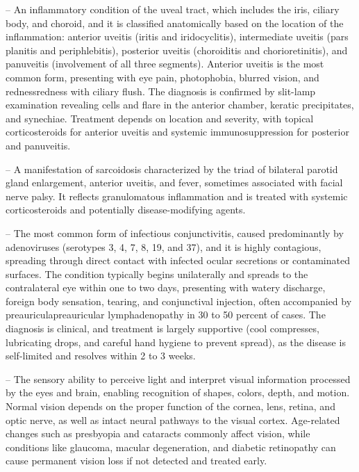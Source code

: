 -- An inflammatory condition of the uveal tract, which includes the iris, ciliary body, and choroid, and it is classified anatomically based on the location of the inflammation: anterior uveitis (iritis and iridocyclitis), intermediate uveitis (pars planitis and periphlebitis), posterior uveitis (choroiditis and chorioretinitis), and panuveitis (involvement of all three segments). Anterior uveitis is the most common form, presenting with eye pain, photophobia, blurred vision, and rednessredness with ciliary flush. The diagnosis is confirmed by slit-lamp examination revealing cells and flare in the anterior chamber, keratic precipitates, and synechiae. Treatment depends on location and severity, with topical corticosteroids for anterior uveitis and systemic immunosuppression for posterior and panuveitis.

-- A manifestation of sarcoidosis characterized by the triad of bilateral parotid gland enlargement, anterior uveitis, and fever, sometimes associated with facial nerve palsy. It reflects granulomatous inflammation and is treated with systemic corticosteroids and potentially disease-modifying agents.

-- The most common form of infectious conjunctivitis, caused predominantly by adenoviruses (serotypes 3, 4, 7, 8, 19, and 37), and it is highly contagious, spreading through direct contact with infected ocular secretions or contaminated surfaces. The condition typically begins unilaterally and spreads to the contralateral eye within one to two days, presenting with watery discharge, foreign body sensation, tearing, and conjunctival injection, often accompanied by preauriculapreauricular lymphadenopathy in 30 to 50 percent of cases. The diagnosis is clinical, and treatment is largely supportive (cool compresses, lubricating drops, and careful hand hygiene to prevent spread), as the disease is self-limited and resolves within 2 to 3 weeks.

-- The sensory ability to perceive light and interpret visual information processed by the eyes and brain, enabling recognition of shapes, colors, depth, and motion. Normal vision depends on the proper function of the cornea, lens, retina, and optic nerve, as well as intact neural pathways to the visual cortex. Age-related changes such as presbyopia and cataracts commonly affect vision, while conditions like glaucoma, macular degeneration, and diabetic retinopathy can cause permanent vision loss if not detected and treated early.

